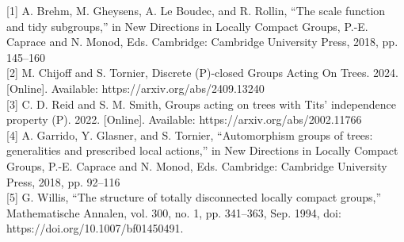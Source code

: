 \documentclass[preview]{standalone}
\begin{document}
\begin{center}
[1] A. Brehm, M. Gheysens, A. Le Boudec, and R. Rollin, ``The scale function and tidy subgroups,'' in New Directions in Locally Compact Groups, P.-E. Caprace and N. Monod, Eds. Cambridge: Cambridge University Press, 2018, pp. 145--160 \\{} [2] M. Chijoff and S. Tornier, Discrete (P)-closed Groups Acting On Trees. 2024. [Online]. Available: https://arxiv.org/abs/2409.13240 \\{} [3] C. D. Reid and S. M. Smith, Groups acting on trees with Tits' independence property (P). 2022. [Online]. Available: https://arxiv.org/abs/2002.11766 \\{} [4] A. Garrido, Y. Glasner, and S. Tornier, ``Automorphism groups of trees: generalities and prescribed local actions,'' in New Directions in Locally Compact Groups, P.-E. Caprace and N. Monod, Eds. Cambridge: Cambridge University Press, 2018, pp. 92--116 \\{} [5] G. Willis, ``The structure of totally disconnected locally compact groups,'' Mathematische Annalen, vol. 300, no. 1, pp. 341--363, Sep. 1994, doi: https://doi.org/10.1007/bf01450491.
\end{center}
\end{document}
